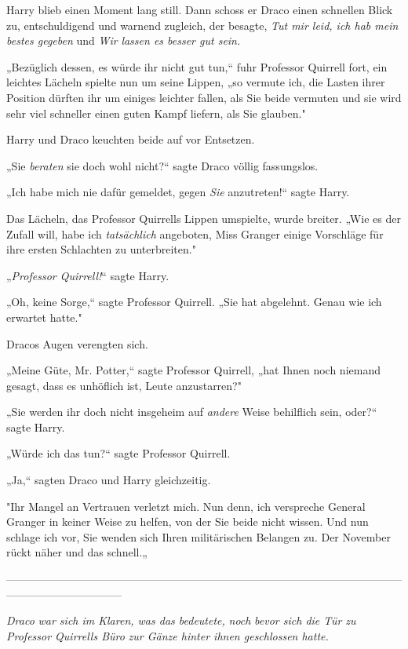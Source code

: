 {Harry blieb einen Moment lang still. Dann schoss er Draco einen schnellen Blick zu, entschuldigend und warnend zugleich, der besagte, \emph{Tut mir leid, ich hab mein bestes gegeben} und \emph{Wir} \emph{lassen es besser gut sein.}

„Bezüglich dessen, es würde ihr nicht gut tun,“ fuhr Professor Quirrell fort, ein leichtes Lächeln spielte nun um seine Lippen, „so vermute ich, die Lasten ihrer Position dürften ihr um einiges leichter fallen, als Sie beide vermuten und sie wird sehr viel schneller einen guten Kampf liefern, als Sie glauben."

Harry und Draco keuchten beide auf vor Entsetzen.

„Sie \emph{beraten} sie doch wohl nicht?“ sagte Draco völlig fassungslos.

„Ich habe mich nie dafür gemeldet, gegen \emph{Sie} anzutreten!“ sagte Harry.

Das Lächeln, das Professor Quirrells Lippen umspielte, wurde breiter. „Wie es der Zufall will, habe ich \emph{tatsächlich} angeboten, Miss Granger einige Vorschläge für ihre ersten Schlachten zu unterbreiten."

„\emph{Professor Quirrell!}“ sagte Harry.

„Oh, keine Sorge,“ sagte Professor Quirrell. „Sie hat abgelehnt. Genau wie ich erwartet hatte."

Dracos Augen verengten sich.

„Meine Güte, Mr. Potter,“ sagte Professor Quirrell, „hat Ihnen noch niemand gesagt, dass es unhöflich ist, Leute anzustarren?"

„Sie werden ihr doch nicht insgeheim auf \emph{andere} Weise behilflich sein, oder?“ sagte Harry.

„Würde ich das tun?“ sagte Professor Quirrell.

„Ja,“ sagten Draco und Harry gleichzeitig.

"Ihr Mangel an Vertrauen verletzt mich. Nun denn, ich verspreche General Granger in keiner Weise zu helfen, von der Sie beide nicht wissen. Und nun schlage ich vor, Sie wenden sich Ihren militärischen Belangen zu. Der November rückt näher und das schnell.„

--------------------------------------------------------------------------------------------------------------------------------------------

\hfill\break \emph{Draco} \emph{war sich im Klaren, was das bedeutete,} \emph{noch} \emph{bevor sich die Tür} \emph{zu Professor Quirrells Büro} \emph{zur Gänze hinter ihnen geschlossen hatte.}

}
